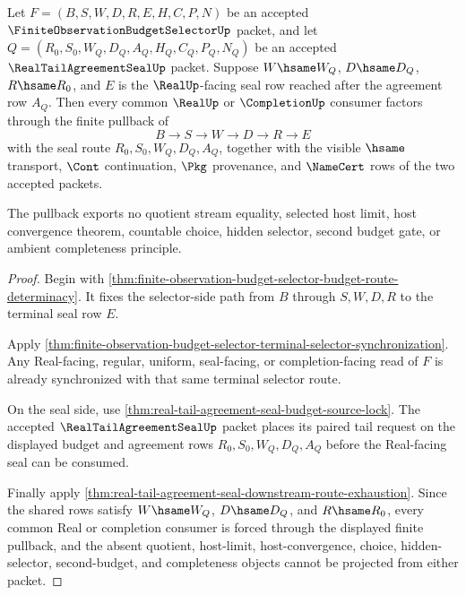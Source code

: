 \begin{theorem}
\label{thm:finite-observation-budget-selector-realtailagreementseal-pullback}
Let $F=(B,S,W,D,R,E,H,C,P,N)$ be an accepted $\FiniteObservationBudgetSelectorUp$ packet, and let $Q=(R_0,S_0,W_Q,D_Q,A_Q,H_Q,C_Q,P_Q,N_Q)$ be an accepted $\RealTailAgreementSealUp$ packet. Suppose $W \hsame W_Q$, $D \hsame D_Q$, $R \hsame R_0$, and $E$ is the $\RealUp$-facing seal row reached after the agreement row $A_Q$. Then every common $\RealUp$ or $\CompletionUp$ consumer factors through the finite pullback of
$$
B \to S \to W \to D \to R \to E
$$
with the seal route $R_0,S_0,W_Q,D_Q,A_Q$, together with the visible $\hsame$ transport, $\Cont$ continuation, $\Pkg$ provenance, and $\NameCert$ rows of the two accepted packets.

The pullback exports no quotient stream equality, selected host limit, host convergence theorem, countable choice, hidden selector, second budget gate, or ambient completeness principle.
\end{theorem}
\begin{proof}
Begin with \autoref{thm:finite-observation-budget-selector-budget-route-determinacy}. It fixes the selector-side path from $B$ through $S,W,D,R$ to the terminal seal row $E$.

Apply \autoref{thm:finite-observation-budget-selector-terminal-selector-synchronization}. Any Real-facing, regular, uniform, seal-facing, or completion-facing read of $F$ is already synchronized with that same terminal selector route.

On the seal side, use \autoref{thm:real-tail-agreement-seal-budget-source-lock}. The accepted $\RealTailAgreementSealUp$ packet places its paired tail request on the displayed budget and agreement rows $R_0,S_0,W_Q,D_Q,A_Q$ before the Real-facing seal can be consumed.

Finally apply \autoref{thm:real-tail-agreement-seal-downstream-route-exhaustion}. Since the shared rows satisfy $W \hsame W_Q$, $D \hsame D_Q$, and $R \hsame R_0$, every common Real or completion consumer is forced through the displayed finite pullback, and the absent quotient, host-limit, host-convergence, choice, hidden-selector, second-budget, and completeness objects cannot be projected from either packet.
\end{proof}

